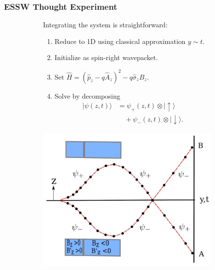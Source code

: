 \documentclass[compress,10pt,usenames,dvipsnames]{beamer}
\theoremstyle{remark}
\begin{document}
\begin{frame}\frametitle{ESSW Thought Experiment}
	\begin{figure}
		\begin{subfigure}[t]{.6\textwidth}
			\vspace*{-1.5in}
			Integrating the system is straightforward:
			\begin{enumerate}
				\item<2-5> Reduce to 1D using classical approximation $y\sim t$.
				\item<3-5> Initialize as spin-right wavepacket.
				\item<4-5> Set $\hat{H} = (\hat{p}_z - q\hat{A}_z)^2 - q\hat{\sigma}_z\hat{B}_z$.
				\item<5> Solve by decomposing 
				\begin{align*}|\psi(z,t)\rangle &= \psi_+(z,t)\otimes|\!\uparrow\rangle \\
					&\quad+ \psi_-(z,t)\otimes|\!\downarrow\rangle.
				\end{align*}
			\end{enumerate}
		\end{subfigure}%
		\begin{subfigure}[t]{.4\textwidth}
			\centering
			\includegraphics[scale=0.25]{Figures/diag1.png}
		\end{subfigure}
	\end{figure}
\end{frame}
\end{document}
